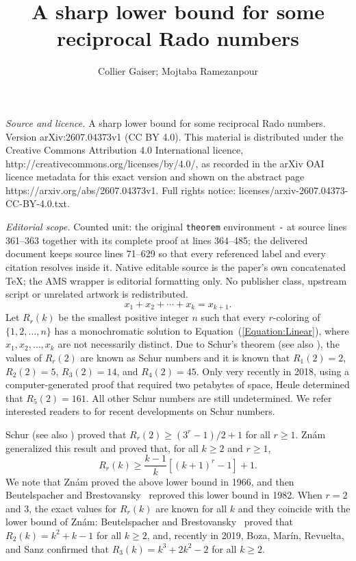 \documentclass[10pt,a4paper]{amsart}
\begin{document}
\title[A sharp lower bound for some reciprocal Rado numbers]{A sharp lower bound for some reciprocal Rado numbers}
\author{Collier Gaiser; Mojtaba Ramezanpour}
\date{}
\maketitle
\noindent\emph{Source and licence.} A sharp lower bound for some reciprocal Rado numbers. Version arXiv:2607.04373v1 (CC BY 4.0). This material is distributed under the Creative Commons Attribution 4.0 International licence, http://creativecommons.org/licenses/by/4.0/, as recorded in the arXiv OAI licence metadata for this exact version and shown on the abstract page https://arxiv.org/abs/2607.04373v1. Full rights notice: licenses/arxiv-2607.04373-CC-BY-4.0.txt.\par\smallskip
\noindent\textit{Editorial scope.} Counted unit: the original \texttt{theorem} environment \texttt{-} at source lines 361--363 together with its complete proof at lines 364--485; the delivered document keeps source lines 71--629 so that every referenced label and every citation resolves inside it. Native editable source is the paper's own concatenated TeX; the AMS wrapper is editorial formatting only. No publisher class, upstream script or unrelated artwork is redistributed.
\begin{equation}\label{Equation:Linear}
x_1+x_2+\cdots+x_k=x_{k+1}.
\end{equation}
Let $R_r(k)$ be the smallest positive integer $n$ such that every $r$-coloring of $\{1,2,\ldots,n\}$ has a monochromatic solution to Equation~(\ref{Equation:Linear}), where $x_1,x_2,\ldots,x_k$ are not necessarily distinct. Due to Schur's theorem \cite{Schur1916} (see also \cite[Chapter 8]{LandmanRobertson2014}), the values of $R_r(2)$ are known as Schur numbers and it is known that $R_1(2)=2$, $R_2(2)=5$, $R_3(2)=14$, and $R_4(2)=45$. Only very recently in 2018, using a computer-generated proof that required two petabytes of space, Heule \cite{Heule2018} determined that $R_5(2)=161$. All other Schur numbers are still undetermined. We refer interested readers to \cite{ACPPRT2022} for recent developments on Schur numbers.

Schur \cite{Schur1916} (see also \cite[Theorem 8.9]{LandmanRobertson2014}) proved that $R_r(2)\geq(3^r-1)/2+1$ for all $r\geq1$. Zn\'{a}m \cite{Znam1966} generalized this result and proved that, for all $k\geq2$ and $r\geq1$,
\[
R_r(k)\geq\frac{k-1}{k}\left[(k+1)^r-1\right]+1.
\]
We note that Zn\'{a}m \cite{Znam1966} proved the above lower bound in 1966, and then Beutelspacher and Brestovansky~\cite{BeutelspacherBrestovansky1982} reproved this lower bound in 1982. When $r=2$ and $3$, the exact values for $R_r(k)$ are known for all $k$ and they coincide with the lower bound of Zn\'{a}m: Beutelspacher and Brestovansky~\cite{BeutelspacherBrestovansky1982} proved that $R_2(k)=k^2+k-1$ for all $k\geq2$, and, recently in 2019, Boza, Mar\'{i}n, Revuelta, and Sanz \cite{BMRS2019} confirmed that $R_3(k)=k^3+2k^2-2$ for all $k\geq2$.
\end{document}
